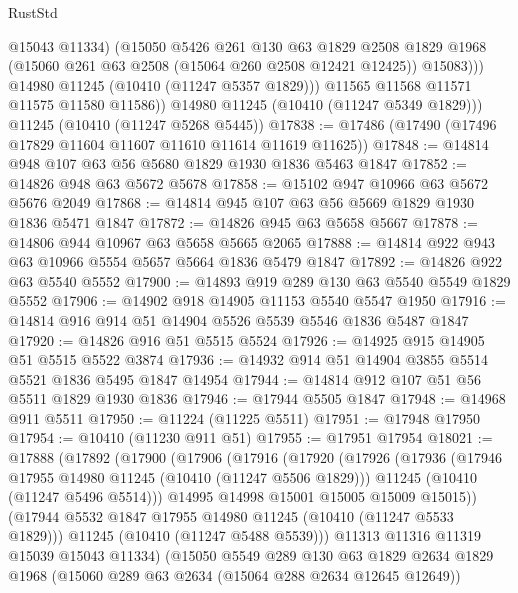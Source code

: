 \begin{lexlean}{RustStd}
\begin{coremodule}
                  @15043
                  @11334)
                (@15050
                  @5426
                  @261
                  @130
                  @63
                  @1829
                  @2508
                  @1829
                  @1968
                  (@15060 @261 @63 @2508 (@15064 @260 @2508 @12421 @12425))
                  @15083)))
            @14980
            @11245
            (@10410 (@11247 @5357 @1829)))
          @11565
          @11568
          @11571
          @11575
          @11580
          @11586))
      @14980
      @11245
      (@10410 (@11247 @5349 @1829)))
    @11245
    (@10410 (@11247 @5268 @5445))
@17838 := @17486 (@17490 (@17496 @17829 @11604 @11607 @11610 @11614 @11619 @11625))
@17848 := @14814 @948 @107 @63 @56 @5680 @1829 @1930 @1836 @5463 @1847
@17852 := @14826 @948 @63 @5672 @5678
@17858 := @15102 @947 @10966 @63 @5672 @5676 @2049
@17868 := @14814 @945 @107 @63 @56 @5669 @1829 @1930 @1836 @5471 @1847
@17872 := @14826 @945 @63 @5658 @5667
@17878 := @14806 @944 @10967 @63 @5658 @5665 @2065
@17888 := @14814 @922 @943 @63 @10966 @5554 @5657 @5664 @1836 @5479 @1847
@17892 := @14826 @922 @63 @5540 @5552
@17900 := @14893 @919 @289 @130 @63 @5540 @5549 @1829 @5552
@17906 := @14902 @918 @14905 @11153 @5540 @5547 @1950
@17916 := @14814 @916 @914 @51 @14904 @5526 @5539 @5546 @1836 @5487 @1847
@17920 := @14826 @916 @51 @5515 @5524
@17926 := @14925 @915 @14905 @51 @5515 @5522 @3874
@17936 := @14932 @914 @51 @14904 @3855 @5514 @5521 @1836 @5495 @1847 @14954
@17944 := @14814 @912 @107 @51 @56 @5511 @1829 @1930 @1836
@17946 := @17944 @5505 @1847
@17948 := @14968 @911 @5511
@17950 := @11224 (@11225 @5511)
@17951 := @17948 @17950
@17954 := @10410 (@11230 @911 @51)
@17955 := @17951 @17954
@18021 := @17888
    (@17892
      (@17900
        (@17906
          (@17916
            (@17920
              (@17926
                (@17936
                  (@17946 @17955 @14980 @11245 (@10410 (@11247 @5506 @1829)))
                  @11245
                  (@10410 (@11247 @5496 @5514)))
                @14995
                @14998
                @15001
                @15005
                @15009
                @15015))
            (@17944 @5532 @1847 @17955 @14980 @11245 (@10410 (@11247 @5533 @1829)))
            @11245
            (@10410 (@11247 @5488 @5539)))
          @11313
          @11316
          @11319
          @15039
          @15043
          @11334)
        (@15050
          @5549
          @289
          @130
          @63
          @1829
          @2634
          @1829
          @1968
          (@15060 @289 @63 @2634 (@15064 @288 @2634 @12645 @12649))

\end{coremodule}
\end{lexlean}
